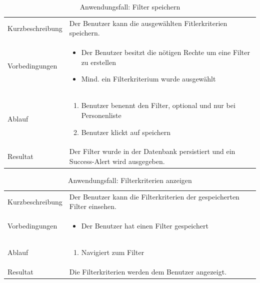 \begin{table}[h!]
   \begin{tabular}{|L{0.3\textwidth}|L{0.6\textwidth}|}
       \hline
         \\[4pt]
       \hline
       Kurzbeschreibung & Der Benutzer kann die ausgewählten Fitlerkriterien speichern. \\
       \hline
       Vorbedingungen & 
       \begin{itemize}
         \item Der Benutzer besitzt die nötigen Rechte um eine Filter zu erstellen
         \item Mind. ein Filterkriterium wurde ausgewählt
       \end{itemize} \\
       \hline
       Ablauf & \begin{enumerate}
         \item Benutzer benennt den Filter, optional und nur bei Personenliste
         \item Benutzer klickt auf speichern
       \end{enumerate}  \\
       \hline
       Resultat & Der Filter wurde in der Datenbank persistiert und ein Success-Alert wird ausgegeben. \\
       \hline
   \end{tabular}
   \caption{Anwendungsfall: Filter speichern}
\end{table}

\newpage

\begin{table}[h!]
   \begin{tabular}{|L{0.3\textwidth}|L{0.6\textwidth}|}
      \hline
        \\[4pt]
      \hline
      Kurzbeschreibung & Der Benutzer kann die Filterkriterien der gespeicherten Filter einsehen. \\
      \hline
      Vorbedingungen & 
      \begin{itemize}
         \item Der Benutzer hat einen Filter gespeichert
      \end{itemize}  \\
      \hline
      Ablauf & \begin{enumerate}
      \item Navigiert zum Filter
      \end{enumerate}  \\
      \hline
      Resultat & Die Filterkriterien werden dem Benutzer angezeigt. \\
      \hline
   \end{tabular}
   \caption{Anwendungsfall: Filterkriterien anzeigen}
\end{table}

